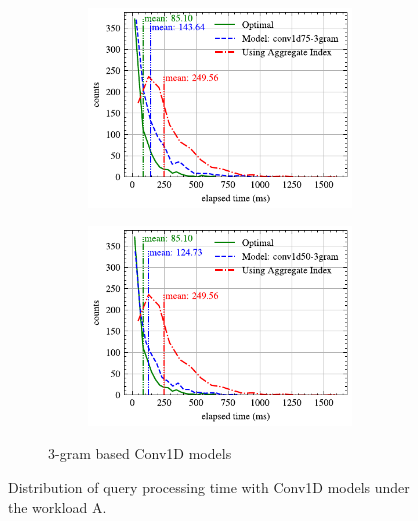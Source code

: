 \begin{figure}[!h]
\begin{subfigure}{0.45\textwidth}
\begin{subfigure}{\textwidth}
			\includegraphics[]{my/graphics/perf_dist_conv1d75_3gram_A.pdf}
		\end{subfigure}
		\vfill
		\begin{subfigure}{\textwidth}
			\centering
			\includegraphics[]{my/graphics/perf_dist_conv1d50_3gram_A.pdf}
		\end{subfigure}
		\caption{3-gram based Conv1D models}
	\end{subfigure}
	\caption{Distribution of query processing time with Conv1D models under the workload A.}
	\label{fig:conv1d_perf_all_A}
\end{figure}
